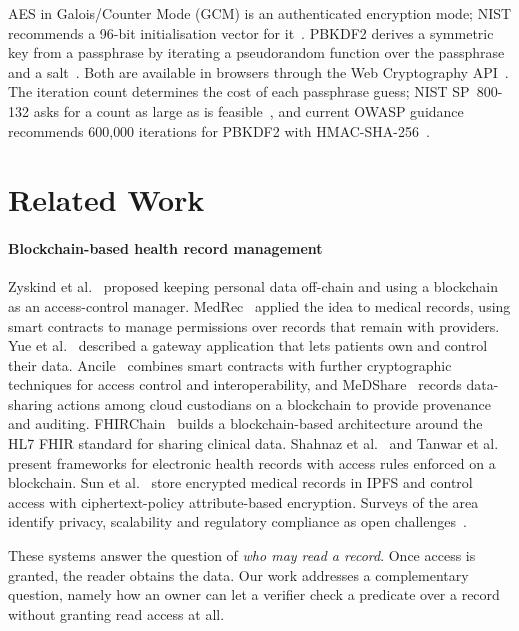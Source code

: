 AES in Galois/Counter Mode (GCM) is an authenticated encryption mode; NIST
recommends a 96-bit initialisation vector for it~\cite{dworkin2007gcm}.
PBKDF2 derives a symmetric key from a passphrase by iterating a pseudorandom
function over the passphrase and a salt~\cite{rfc8018,turan2010pbkdf}. Both
are available in browsers through the Web Cryptography
API~\cite{w3c2017webcrypto}. The iteration count determines the cost of each
passphrase guess; NIST SP~800-132 asks for a count as large as is
feasible~\cite{turan2010pbkdf}, and current OWASP guidance recommends
600{,}000 iterations for PBKDF2 with HMAC-SHA-256~\cite{owasp-password}.

\section{Related Work}\label{sec:related}

\paragraph{Blockchain-based health record management}
Zyskind et al.~\cite{zyskind2015decentralizing} proposed keeping personal
data off-chain and using a blockchain as an access-control manager.
MedRec~\cite{azaria2016medrec} applied the idea to medical records, using
smart contracts to manage permissions over records that remain with
providers. Yue et al.~\cite{yue2016hdg} described a gateway application that
lets patients own and control their data. Ancile~\cite{dagher2018ancile}
combines smart contracts with further cryptographic techniques for access
control and interoperability, and MeDShare~\cite{xia2017medshare} records
data-sharing actions among cloud custodians on a blockchain to provide
provenance and auditing. FHIRChain~\cite{zhang2018fhirchain} builds a
blockchain-based architecture around the HL7 FHIR standard for sharing
clinical data. Shahnaz et al.~\cite{shahnaz2019ehr} and Tanwar et
al.~\cite{tanwar2020ehr} present frameworks for electronic health records
with access rules enforced on a blockchain. Sun et al.~\cite{sun2020ipfs}
store encrypted medical records in IPFS and control access with
ciphertext-policy attribute-based encryption. Surveys of the area
identify privacy, scalability and regulatory compliance as open
challenges~\cite{kuo2017blockchain,mcghin2019blockchain,zhang2020security}.

These systems answer the question of \emph{who may read a record}. Once
access is granted, the reader obtains the data. Our work addresses a
complementary question, namely how an owner can let a verifier check a
predicate over a record without granting read access at all.

